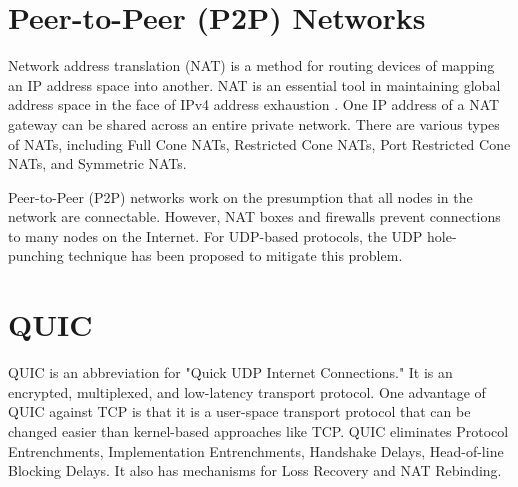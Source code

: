 \section{Peer-to-Peer (P2P) Networks}

Network address translation (NAT) is a method for routing devices of mapping an IP address space into another. NAT is an essential tool in maintaining global address space in the face of IPv4 address exhaustion \cite{durand2011dual}. One IP address of a NAT gateway can be shared across an entire private network. There are various types of NATs, including Full Cone NATs, Restricted Cone NATs, Port Restricted Cone NATs, and Symmetric NATs. \cite{wei2008new}

Peer-to-Peer (P2P) networks work on the presumption that all nodes in the network are connectable. However, NAT boxes and firewalls prevent connections to many nodes on the Internet. For UDP-based protocols, the UDP hole-punching technique has been proposed to mitigate this problem. \cite{halkes2011udp}

\section{QUIC}

QUIC is an abbreviation for "Quick UDP Internet Connections." It is an encrypted, multiplexed, and low-latency transport protocol. One advantage of QUIC against TCP is that it is a user-space transport protocol that can be changed easier than kernel-based approaches like TCP. QUIC eliminates Protocol Entrenchments, Implementation Entrenchments, Handshake Delays, Head-of-line Blocking Delays. It also has mechanisms for Loss Recovery and NAT Rebinding. \cite{langley2017quic}

